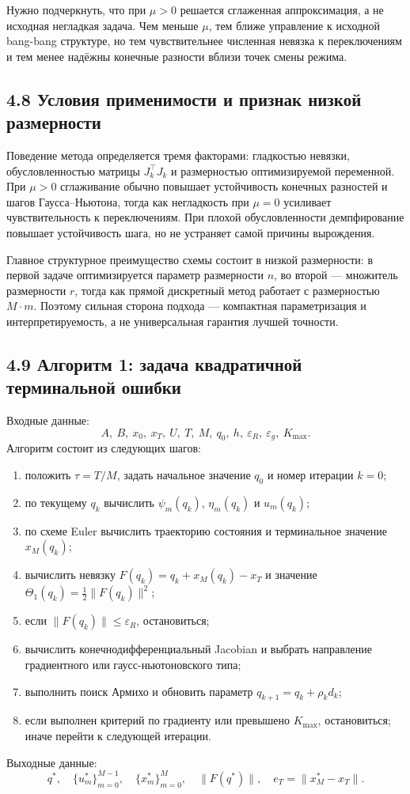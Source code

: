 \documentclass[a4paper,12pt]{article}
\begin{document}
Нужно подчеркнуть, что при $\mu>0$ решается сглаженная аппроксимация, а не исходная негладкая задача. Чем меньше $\mu$, тем ближе управление к исходной bang-bang структуре, но тем чувствительнее численная невязка к переключениям и тем менее надёжны конечные разности вблизи точек смены режима.

\subsection{4.8 Условия применимости и признак низкой размерности}

Поведение метода определяется тремя факторами: гладкостью невязки, обусловленностью матрицы $J_k^\top J_k$ и размерностью оптимизируемой переменной. При $\mu>0$ сглаживание обычно повышает устойчивость конечных разностей и шагов Гаусса--Ньютона, тогда как негладкость при $\mu=0$ усиливает чувствительность к переключениям. При плохой обусловленности демпфирование повышает устойчивость шага, но не устраняет самой причины вырождения.

Главное структурное преимущество схемы состоит в низкой размерности: в первой задаче оптимизируется параметр размерности $n$, во второй --- множитель размерности $r$, тогда как прямой дискретный метод работает с размерностью $M\cdot m$. Поэтому сильная сторона подхода --- компактная параметризация и интерпретируемость, а не универсальная гарантия лучшей точности.

\subsection{4.9 Алгоритм 1: задача квадратичной терминальной ошибки}

Входные данные:
\[
A,\ B,\ x_0,\ x_T,\ U,\ T,\ M,\ q_0,\ h,\ \varepsilon_R,\ \varepsilon_g,\ K_{\max}.
\]
Алгоритм состоит из следующих шагов:
\begin{enumerate}
\item положить $\tau=T/M$, задать начальное значение $q_0$ и номер итерации $k=0$;
\item по текущему $q_k$ вычислить $\psi_m(q_k)$, $\eta_m(q_k)$ и $u_m(q_k)$;
\item по схеме Euler вычислить траекторию состояния и терминальное значение $x_M(q_k)$;
\item вычислить невязку $F(q_k)=q_k+x_M(q_k)-x_T$ и значение $\Theta_1(q_k)=\frac12\|F(q_k)\|^2$;
\item если $\|F(q_k)\|\le\varepsilon_R$, остановиться;
\item вычислить конечнодифференциальный Jacobian и выбрать направление градиентного или гаусс-ньютоновского типа;
\item выполнить поиск Армихо и обновить параметр $q_{k+1}=q_k+\rho_k d_k$;
\item если выполнен критерий по градиенту или превышено $K_{\max}$, остановиться; иначе перейти к следующей итерации.
\end{enumerate}
Выходные данные:
\[
q^*,\quad \{u_m^*\}_{m=0}^{M-1},\quad \{x_m^*\}_{m=0}^{M},\quad
\|F(q^*)\|,\quad e_T=\|x_M^*-x_T\|.
\]
\end{document}
